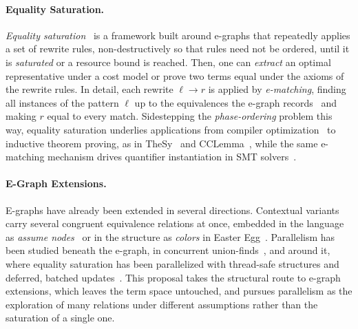 \paragraph{Equality Saturation.} \textit{Equality saturation}~\cite{tate2009eqsat, willsey2021egg}
is a framework built around e-graphs that repeatedly applies a set of rewrite 
rules, non-destructively so that
rules need not be ordered, until it is \textit{saturated} or a resource bound is
reached. Then, one can \textit{extract} an optimal representative under a cost
model or prove two terms equal under the axioms of the rewrite rules. In detail,
each rewrite $\ell \to r$ is applied by \textit{e-matching}, finding all
instances of the pattern $\ell$ up to the equivalences the e-graph
records~\cite{demoura2007ematching} and making $r$ equal to every match.
Sidestepping the \textit{phase-ordering} problem this way, equality saturation
underlies applications from compiler optimization~\cite{tate2009eqsat} to
inductive theorem proving, as in TheSy~\cite{singher2021thesy} and
CCLemma~\cite{kurashige2024cclemma}, while the same e-matching mechanism drives
quantifier instantiation in SMT solvers~\cite{demoura2007ematching}.

\paragraph{E-Graph Extensions.} E-graphs have already been extended in several 
directions. Contextual variants carry several congruent equivalence relations at 
once, embedded in the language as 
\textit{assume nodes}~\cite{coward2024constraint} or in the
structure as \textit{colors} in Easter Egg~\cite{singher2024easteregg}.
Parallelism has been studied beneath the e-graph, in concurrent
union-finds~\cite{jayanti2016concurrent}, and around it, where equality
saturation has been parallelized with thread-safe structures and deferred,
batched updates~\cite{vandercruysse2026parallel}. This proposal takes
the structural route to e-graph extensions, which leaves the term space 
untouched, and pursues parallelism as the exploration of many relations under
different assumptions rather than the saturation of a single one.

